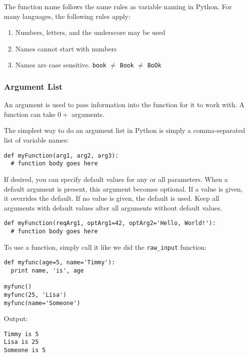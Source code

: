 \documentclass[11pt, letterpaper]{article}
\begin{document}
The function name follows the same rules as variable naming in Python. For many languages, the following rules apply:

\begin{enumerate}
	\item Numbers, letters, and the underscore may be used
	\item Names cannot start with numbers
	\item Names are case sensitive. {\tt book} $\ne$ {\tt Book} $\ne$ {\tt BoOk}
\end{enumerate}

\subsubsection*{Argument List}

An argument is used to pass information into the function for it to work with. A function can take $0+$ arguments.

The simplest way to do an argument list in Python is simply a comma-separated list of variable names:

\begin{lstlisting}
def myFunction(arg1, arg2, arg3):
  # function body goes here
\end{lstlisting}

If desired, you can specify default values for any or all parameters. When a default argument is present, this argument becomes optional. If a value is given, it overrides the default. If no value is given, the default is used. Keep all arguments with default values after all arguments without default values.

\begin{lstlisting}
def myFunction(reqArg1, optArg1=42, optArg2='Hello, World!'):
  # function body goes here
\end{lstlisting}

To use a function, simply call it like we did the {\tt raw\_input} function:

\begin{lstlisting}
def myfunc(age=5, name='Timmy'):
  print name, 'is', age

myfunc()
myfunc(25, 'Lisa')
myfunc(name='Someone')
\end{lstlisting}

Output:

\begin{verbatim}
Timmy is 5
Lisa is 25
Someone is 5
\end{verbatim}
\end{document}
